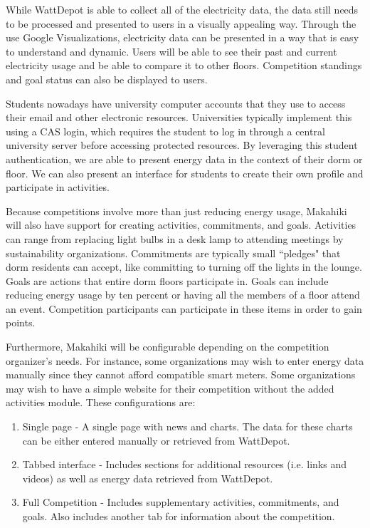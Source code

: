 While WattDepot is able to collect all of the electricity data, the data still needs to be processed and presented to users in a visually appealing way.  Through the use Google Visualizations, electricity data can be presented in a way that is easy to understand and dynamic.  Users will be able to see their past and current electricity usage and be able to compare it to other floors.  Competition standings and goal status can also be displayed to users.

Students nowadays have university computer accounts that they use to access their email and other electronic resources.  Universities typically implement this using a CAS login, which requires the student to log in through a central university server before accessing protected resources.  By leveraging this student authentication, we are able to present energy data in the context of their dorm or floor.  We can also present an interface for students to create their own profile and participate in activities.

Because competitions involve more than just reducing energy usage, Makahiki will also have support for creating activities, commitments, and goals.  Activities can range from replacing light bulbs in a desk lamp to attending meetings by sustainability organizations.  Commitments are typically small ``pledges" that dorm residents can accept, like committing to turning off the lights in the lounge.  Goals are actions that entire dorm floors participate in.  Goals can include reducing energy usage by ten percent or having all the members of a floor attend an event.  Competition participants can participate in these items in order to gain points.

Furthermore, Makahiki will be configurable depending on the competition organizer's needs.  For instance, some organizations may wish to enter energy data manually since they cannot afford compatible smart meters.  Some organizations may wish to have a simple website for their competition without the added activities module.  These configurations are:

\begin{enumerate}
	\item Single page - A single page with news and charts.  The data for these charts can be either entered manually or retrieved from WattDepot.
	\item Tabbed interface - Includes sections for additional resources (i.e. links and videos) as well as energy data retrieved from WattDepot.
	\item Full Competition - Includes supplementary activities, commitments, and goals.  Also includes another tab for information about the competition.
\end{enumerate}

